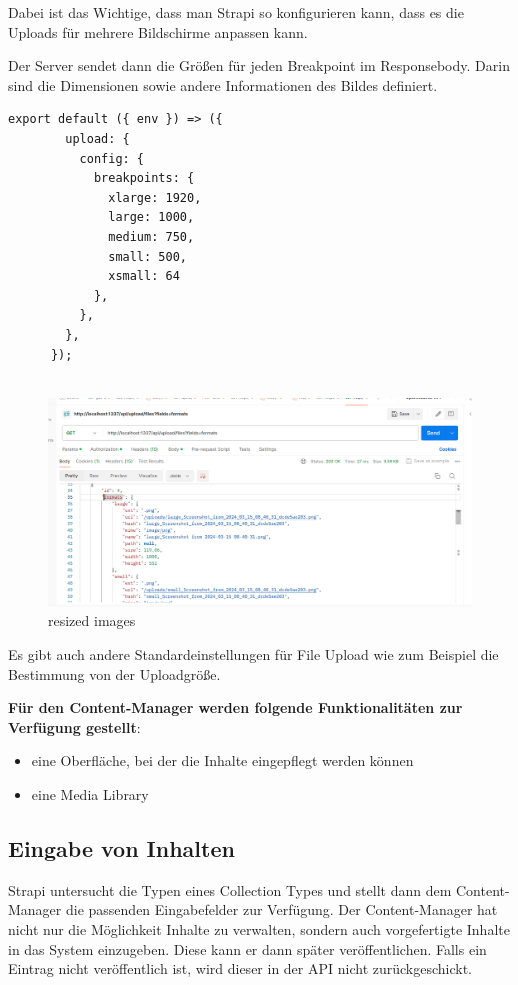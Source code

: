 Dabei ist das Wichtige, dass man Strapi so konfigurieren kann, dass es die Uploads für mehrere Bildschirme anpassen kann.

Der Server sendet dann die Größen für jeden Breakpoint im Responsebody. Darin sind die Dimensionen sowie andere Informationen des Bildes definiert.
\begin{lstlisting}[caption=file upload config in strapi]
    export default ({ env }) => ({
        upload: {
          config: {
            breakpoints: {
              xlarge: 1920,
              large: 1000,
              medium: 750,
              small: 500,
              xsmall: 64
            },
          },
        },
      });
    
\end{lstlisting}
\begin{figure} [H]
  \centering
  \includegraphics[width=\textwidth]{./pics/formats-breakpoints.png}
  \caption{resized images}
\end{figure}
Es gibt auch andere Standardeinstellungen für File Upload wie zum Beispiel die Bestimmung von der Uploadgröße.
\cite{upload}


\textbf{Für den Content-Manager werden folgende Funktionalitäten zur Verfügung gestellt}:
\begin{itemize}
  \item eine Oberfläche, bei der die Inhalte eingepflegt werden können
  \item eine Media Library
\end{itemize}


\subsection{Eingabe von Inhalten}
Strapi untersucht die Typen eines Collection Types und stellt dann dem Content-Manager die passenden
Eingabefelder zur Verfügung. Der Content-Manager hat nicht nur die Möglichkeit Inhalte zu verwalten, sondern
auch vorgefertigte Inhalte in das System einzugeben. Diese kann er dann später veröffentlichen. Falls ein Eintrag
nicht veröffentlich ist, wird dieser in der API nicht zurückgeschickt.

